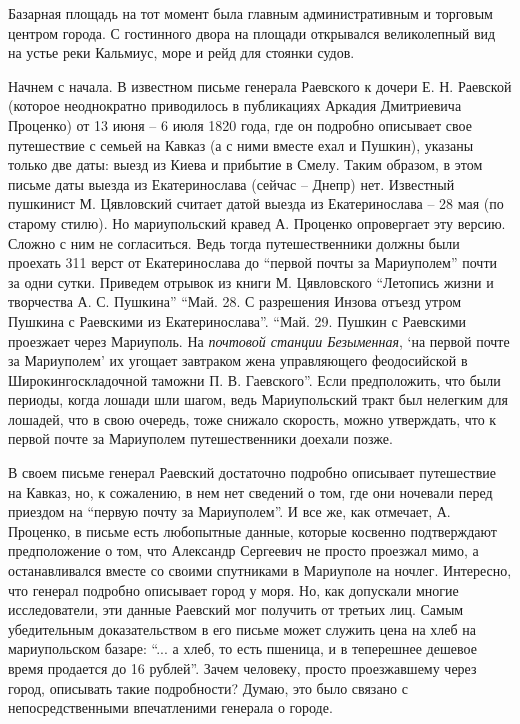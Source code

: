 
Базарная площадь на тот момент была главным административным и торговым центром
города. С гостинного двора на площади открывался великолепный вид на устье реки
Кальмиус, море и рейд для стоянки судов.  

Начнем с начала. В известном письме  генерала Раевского к дочери Е. Н. Раевской
(которое неоднократно приводилось в публикациях Аркадия Дмитриевича Проценко)
от 13 июня – 6 июля 1820 года, где он подробно описывает свое путешествие с
семьей на Кавказ (а с ними вместе ехал и Пушкин), указаны только две даты:
выезд из Киева и прибытие в Смелу. Таким образом, в этом письме даты выезда из
Екатеринослава (сейчас – Днепр) нет. Известный пушкинист М. Цявловский считает
датой выезда из Екатеринослава – 28 мая (по старому стилю). Но мариупольский
кравед А. Проценко  опровергает эту версию. Сложно с ним не согласиться. Ведь
тогда путешественники должны были проехать 311 верст от Екатеринослава до
\enquote{первой почты за Мариуполем} почти за одни сутки. Приведем отрывок из книги М.
Цявловского \enquote{Летопись жизни и творчества А. С. Пушкина} \enquote{Май. 28. С разрешения
Инзова отъезд утром Пушкина с Раевскими из Екатеринослава}. \enquote{Май. 29. Пушкин с
Раевскими проезжает через Мариуполь. На \emph{почтовой станции Безыменная}, \enquote{на
первой почте за Мариуполем} их угощает завтраком жена управляющего феодосийской
в Широкингоскладочной таможни П. В. Гаевского}. Если предположить, что были
периоды, когда лошади шли шагом, ведь Мариупольский тракт был нелегким для
лошадей, что в свою очередь, тоже снижало скорость, можно утверждать, что к
первой почте за Мариуполем путешественники доехали позже.

В своем письме генерал Раевский достаточно подробно описывает путешествие на
Кавказ, но, к сожалению, в нем нет сведений о том, где они ночевали перед
приездом на \enquote{первую почту за Мариуполем}. И все же, как отмечает, А. Проценко,
в письме есть любопытные данные, которые косвенно подтверждают предположение о
том, что Александр Сергеевич не просто проезжал мимо, а останавливался вместе
со своими спутниками в Мариуполе на ночлег. Интересно, что генерал подробно
описывает город у моря. Но, как допускали многие исследователи, эти данные
Раевский мог получить от третьих лиц. Самым убедительным доказательством в его
письме может служить цена на хлеб на мариупольском базаре: \enquote{... а хлеб, то есть
пшеница, и в теперешнее дешевое время продается до 16 рублей}. Зачем человеку,
просто проезжавшему через город, описывать такие подробности? Думаю, это было
связано с непосредственными впечатленими генерала  о городе.

